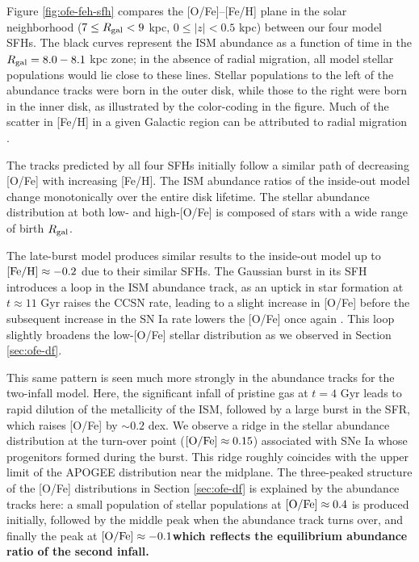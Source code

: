 \documentclass[twocolumn,twocolappendix,linenumbers]{aastex631}
\begin{document}
Figure \ref{fig:ofe-feh-sfh} compares the [O/Fe]--[Fe/H] plane in the solar neighborhood ($7\leq R_{\rm gal}<9$ kpc, $0\leq|z|<0.5$ kpc) between our four model SFHs. The black curves represent the ISM abundance as a function of time in the $R_{\rm gal}=8.0-8.1$ kpc zone; in the absence of radial migration, all model stellar populations would lie close to these lines. Stellar populations to the left of the abundance tracks were born in the outer disk, while those to the right were born in the inner disk, as illustrated by the color-coding in the figure. Much of the scatter in [Fe/H] in a given Galactic region can be attributed to radial migration \citep{Edvardsson1993-ChemicalEvolution}.

The tracks predicted by all four SFHs initially follow a similar path of decreasing [O/Fe] with increasing [Fe/H]. The ISM abundance ratios of the inside-out model change monotonically over the entire disk lifetime. The stellar abundance distribution at both low- and high-[O/Fe] is composed of stars with a wide range of birth $R_{\rm gal}$. 

The late-burst model produces similar results to the inside-out model up to ${\rm [Fe/H]}\approx-0.2$ due to their similar SFHs. The Gaussian burst in its SFH introduces a loop in the ISM abundance track, as an uptick in star formation at $t\approx11$ Gyr raises the CCSN rate, leading to a slight increase in [O/Fe] before the subsequent increase in the SN Ia rate lowers the [O/Fe] once again \citep[see e.g. Figure 1 of][]{JohnsonWeinberg2020-Starbursts}. This loop slightly broadens the low-[O/Fe] stellar distribution as we observed in Section \ref{sec:ofe-df}.

This same pattern is seen much more strongly in the abundance tracks for the two-infall model. Here, the significant infall of pristine gas at $t=4$ Gyr leads to rapid dilution of the metallicity of the ISM, followed by a large burst in the SFR, which raises [O/Fe] by $\sim 0.2$ dex. We observe a ridge in the stellar abundance distribution at the turn-over point (${\rm [O/Fe]}\approx0.15$) associated with SNe Ia whose progenitors formed during the burst. This ridge roughly coincides with the upper limit of the APOGEE distribution near the midplane. The three-peaked structure of the [O/Fe] distributions in Section \ref{sec:ofe-df} is explained by the abundance tracks here: a small population of stellar populations at ${\rm [O/Fe]}\approx0.4$ is produced initially, followed by the middle peak when the abundance track turns over, and finally the peak at ${\rm [O/Fe]}\approx-0.1${\bf which reflects the equilibrium abundance ratio of the second infall.}
\end{document}
